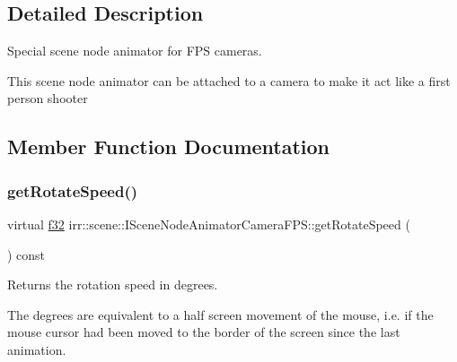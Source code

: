 \subsection{Detailed Description}
Special scene node animator for F\+PS cameras. 

This scene node animator can be attached to a camera to make it act like a first person shooter 

\subsection{Member Function Documentation}
\mbox{\label{classirr_1_1scene_1_1ISceneNodeAnimatorCameraFPS_ab8ef30073df3084712346e1a84be6a9e}} 
\subsubsection{\texorpdfstring{get\+Rotate\+Speed()}{getRotateSpeed()}\hspace{0.1cm}{\footnotesize\ttfamily [1/2]}}
{\footnotesize\ttfamily virtual \hyperlink{namespaceirr_a0277be98d67dc26ff93b1a6a1d086b07}{f32} irr\+::scene\+::\+I\+Scene\+Node\+Animator\+Camera\+F\+P\+S\+::get\+Rotate\+Speed (\begin{DoxyParamCaption}{ }\end{DoxyParamCaption}) const\hspace{0.3cm}{\ttfamily [pure virtual]}}



Returns the rotation speed in degrees. 

The degrees are equivalent to a half screen movement of the mouse, i.\+e. if the mouse cursor had been moved to the border of the screen since the last animation. \mbox{\label{classirr_1_1scene_1_1ISceneNodeAnimatorCameraFPS_ab8ef30073df3084712346e1a84be6a9e}} 
